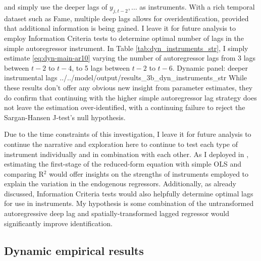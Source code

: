 and simply use the deeper lags of $y_{j,t-2},\dots$ as instruments.
With a rich temporal dataset such as Fame,
multiple deep lags allows for overidentification, provided that additional information is being gained.
I leave it for future analysis to employ Information Criteria tests
to determine optimal number of lags in the simple autoregressor instrument.
In Table \ref{tab:dyn_instruments_str}, I simply estimate \eqref{eq:dyn-main-ar10}
varying the number of autoregressor lags from 3 lags between $t-2$ to $t-4$, to 5 lags between $t-2$ to $t-6$.
\wraptable
    {Dynamic panel: deeper instrumental lags}
    {../../model/output/results_3b_dyn_instruments_str}
    {}
While these results don't offer any obvious new insight from parameter estimates,
they do confirm that continuing with the higher simple autoregressor lag strategy
does not leave the estimation over-identified, with a continuing failure to reject
the Sargan-Hansen J-test's null hypothesis.
\par
Due to the time constraints of this investigation,
I leave it for future analysis to continue the narrative and exploration here
to continue to test each type of instrument individually
and in combination with each other.
As I deployed in ,
estimating the first-stage of the reduced-form equation with simple OLS
and comparing R$^2$ would offer insights on the strengths of instruments
employed to explain the variation in the endogenous regressors.
Additionally, as already discussed, Information Criteria tests would
also helpfully determine optimal lags for use in instruments.
My hypothesis is some combination of the untransformed autoregressive deep lag
and spatially-transformed lagged  regressor
would significantly improve identification.

\subsection{Dynamic empirical results}
\label{ss:dyn-empirical-results}

